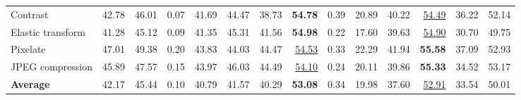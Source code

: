 \begin{table}[t]
{\begin{tabular}{lrrrrrrrrrrrrr}
Contrast & 42.78 & 46.01 & 0.07 & 41.69 & 44.47 & 38.73 & \textbf{54.78} & 0.39 & 20.89 & 40.22 & \underline{54.49} & 36.22 & 52.14 \\
Elastic transform & 41.28 & 45.12 & 0.09 & 41.35 & 45.31 & 41.56 & \textbf{54.98} & 0.22 & 17.60 & 39.63 & \underline{54.90} & 30.70 & 49.75 \\
Pixelate & 47.01 & 49.38 & 0.20 & 43.83 & 44.03 & 44.47 & \underline{54.53} & 0.33 & 22.29 & 41.94 & \textbf{55.58} & 37.09 & 52.93 \\
JPEG compression & 45.89 & 47.57 & 0.15 & 43.97 & 46.03 & 44.49 & \underline{54.10} & 0.24 & 20.11 & 39.86 & \textbf{55.33} & 34.52 & 53.17 \\
\midrule
\textbf{Average} & 42.17 & 45.44 & 0.10 & 40.79 & 41.57 & 40.29 & \textbf{53.08} & 0.34 & 19.98 & 37.60 & \underline{52.91} & 33.54 & 50.01 \\
\bottomrule
\end{tabular}%
}
\end{table}

